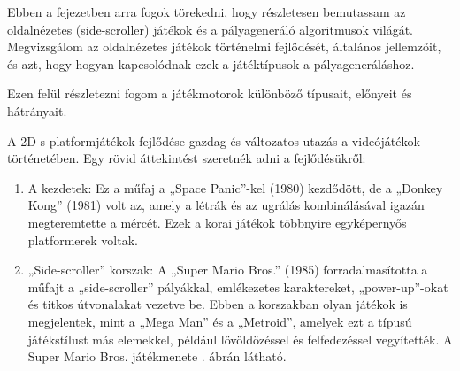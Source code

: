 
Ebben a fejezetben arra fogok törekedni, hogy részletesen bemutassam az oldalnézetes (side-scroller) játékok és a pályageneráló algoritmusok világát. Megvizsgálom az oldalnézetes játékok történelmi fejlődését, általános jellemzőit, és azt, hogy hogyan kapcsolódnak ezek a játéktípusok a pályageneráláshoz. 

Ezen felül részletezni fogom a játékmotorok különböző típusait, előnyeit és hátrányait.


A 2D-s platformjátékok fejlődése gazdag és változatos utazás a videójátékok történetében. Egy rövid áttekintést szeretnék adni a fejlődésükről: \cite{redbull}
\begin{enumerate}
\item A kezdetek: Ez a műfaj a „Space Panic”-kel (1980) kezdődött, de a „Donkey Kong” (1981) volt az, amely a létrák és az ugrálás kombinálásával igazán megteremtette a mércét. Ezek a korai játékok többnyire egyképernyős platformerek voltak.
\item „Side-scroller” korszak: A „Super Mario Bros.” (1985) forradalmasította a műfajt a „side-scroller” pályákkal, emlékezetes karaktereket, „power-up”-okat és titkos útvonalakat vezetve be. Ebben a korszakban olyan játékok is megjelentek, mint a „Mega Man” és a „Metroid”, amelyek ezt a típusú játékstílust más elemekkel, például lövöldözéssel és felfedezéssel vegyítették. A Super Mario Bros. játékmenete . ábrán látható.


\end{enumerate}

